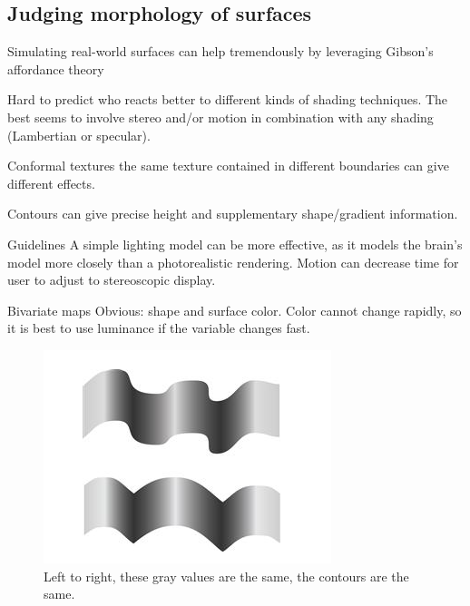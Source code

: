 \begin{mdframed}
\subsection{Judging morphology of surfaces}
\begin{multicols}{2}
\begin{compactdesc}
\item[Simulating real-world] surfaces can help tremendously by leveraging
    Gibson's affordance theory
\item[Hard to predict] who reacts better to different kinds of shading
    techniques. The best seems to involve stereo and/or motion in combination
    with any shading (Lambertian or specular).
\item[Conformal textures] the same texture contained in different boundaries
    can give different effects.
\item[Contours] can give precise height and supplementary shape/gradient
    information.
\item[Guidelines] A simple lighting model can be more effective, as it models
    the brain's model more closely than a photorealistic rendering. Motion
    can decrease time for user to adjust to stereoscopic display.
\item[Bivariate maps] Obvious: shape and surface color. Color cannot change
    rapidly, so it is best to use luminance if the variable changes fast.
\end{compactdesc}
    \begin{figure}[H]
        \centering
        \includegraphics[width=0.4\linewidth]{same_texture_diff_shape.png}
        \caption{Left to right, these gray values are the same, the contours
        are the same.}
    \end{figure}

\end{multicols}\end{mdframed}




